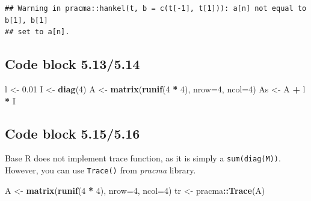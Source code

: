 \documentclass[
]{book}
\newenvironment{Shaded}{\begin{snugshade}}{\end{snugshade}}
\newcommand{\DataTypeTok}[1]{\textcolor[rgb]{0.13,0.29,0.53}{#1}}
\newcommand{\DecValTok}[1]{\textcolor[rgb]{0.00,0.00,0.81}{#1}}
\newcommand{\FloatTok}[1]{\textcolor[rgb]{0.00,0.00,0.81}{#1}}
\newcommand{\KeywordTok}[1]{\textcolor[rgb]{0.13,0.29,0.53}{\textbf{#1}}}
\newcommand{\NormalTok}[1]{#1}
\newcommand{\OperatorTok}[1]{\textcolor[rgb]{0.81,0.36,0.00}{\textbf{#1}}}
\newcommand{\StringTok}[1]{\textcolor[rgb]{0.31,0.60,0.02}{#1}}
\begin{document}
\begin{verbatim}
## Warning in pracma::hankel(t, b = c(t[-1], t[1])): a[n] not equal to b[1], b[1]
## set to a[n].
\end{verbatim}

\hypertarget{code-block-5.135.14}{%
\subsection*{Code block 5.13/5.14}\label{code-block-5.135.14}}

\begin{Shaded}
\begin{Highlighting}[]
\NormalTok{l \textless{}{-}}\StringTok{ }\FloatTok{0.01}
\NormalTok{I \textless{}{-}}\StringTok{ }\KeywordTok{diag}\NormalTok{(}\DecValTok{4}\NormalTok{)}
\NormalTok{A \textless{}{-}}\StringTok{ }\KeywordTok{matrix}\NormalTok{(}\KeywordTok{runif}\NormalTok{(}\DecValTok{4} \OperatorTok{*}\StringTok{ }\DecValTok{4}\NormalTok{), }\DataTypeTok{nrow=}\DecValTok{4}\NormalTok{, }\DataTypeTok{ncol=}\DecValTok{4}\NormalTok{)}
\NormalTok{As \textless{}{-}}\StringTok{ }\NormalTok{A }\OperatorTok{+}\StringTok{ }\NormalTok{l }\OperatorTok{*}\StringTok{ }\NormalTok{I}
\end{Highlighting}
\end{Shaded}

\hypertarget{code-block-5.155.16}{%
\subsection*{Code block 5.15/5.16}\label{code-block-5.155.16}}

Base R does not implement trace function, as it is simply a \texttt{sum(diag(M))}. However, you can use \texttt{Trace()} from \emph{pracma} library.

\begin{Shaded}
\begin{Highlighting}[]
\NormalTok{A \textless{}{-}}\StringTok{ }\KeywordTok{matrix}\NormalTok{(}\KeywordTok{runif}\NormalTok{(}\DecValTok{4} \OperatorTok{*}\StringTok{ }\DecValTok{4}\NormalTok{), }\DataTypeTok{nrow=}\DecValTok{4}\NormalTok{, }\DataTypeTok{ncol=}\DecValTok{4}\NormalTok{)}
\NormalTok{tr \textless{}{-}}\StringTok{ }\NormalTok{pracma}\OperatorTok{::}\KeywordTok{Trace}\NormalTok{(A)}
\end{Highlighting}
\end{Shaded}
\end{document}
